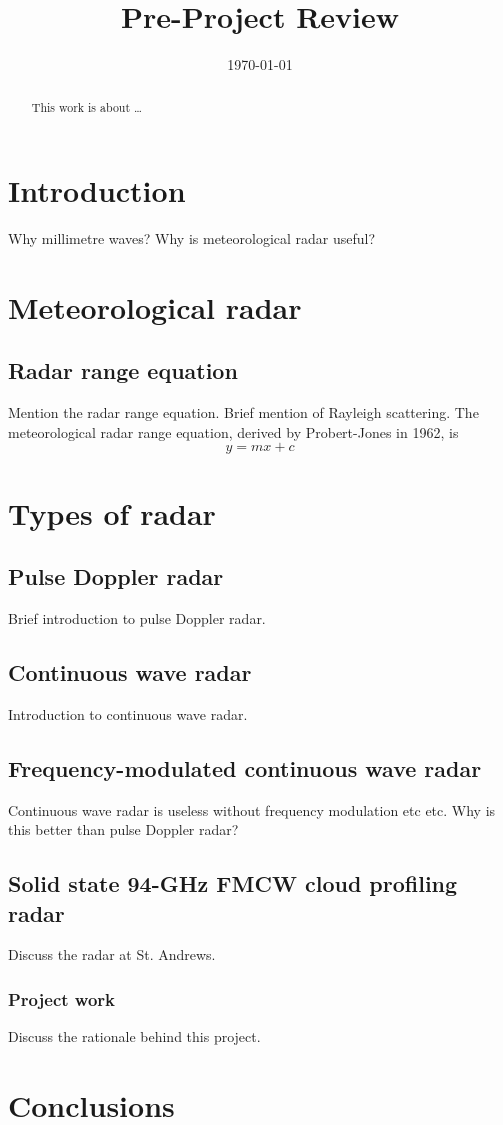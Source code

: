 \documentclass[sotoncolour]{uosarticle}
\title       {Pre-Project Review}
\date        {\today}
\begin{document}
\frontmatter
\maketitle
\begin{abstract}
This work is about \dots
\end{abstract}

\mainmatter

\section{Introduction} \label{sec:Introduction}
Why millimetre waves?
Why is meteorological radar useful?

\section{Meteorological radar}
\subsection{Radar range equation}
Mention the radar range equation.
Brief mention of Rayleigh scattering.
The meteorological radar range equation, derived by Probert-Jones in 1962, is\supercite{ProbertJones}
\begin{equation}
	y = m x + c\label{eqn:MeteoRange}
\end{equation}

\section{Types of radar}
\subsection{Pulse Doppler radar} \label{sec:PulseDopperRadar}
Brief introduction to pulse Doppler radar.

\subsection{Continuous wave radar} \label{sec:CWR}
Introduction to continuous wave radar.

\subsection{Frequency-modulated continuous wave radar} \label{sec:FMCWR}
Continuous wave radar is useless without frequency modulation etc etc.
Why is this better than pulse Doppler radar?

\subsection{Solid state 94-GHz FMCW cloud profiling radar}
Discuss the radar at St. Andrews.

\subsubsection{Project work}
Discuss the rationale behind this project.

\section{Conclusions} \label{sec:Conclusions}


\backmatter
\printbibliography
\end{document}
